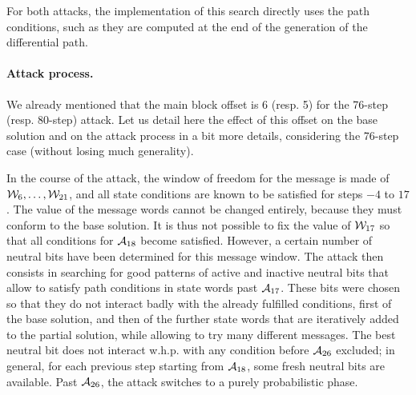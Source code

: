 For both attacks, the implementation of this search directly uses the path conditions, such as they are computed at the end of the generation of the differential path.

\paragraph{Attack process.}
We already mentioned that the main block offset is 6 (resp. 5) for the 76-step (resp. 80-step) attack. Let us detail here the effect of this offset on the base solution and on the attack process
in a bit more details, considering the 76-step case (without losing much generality).

In the course of the attack, the window of freedom for the message is made of $\mathcal{W}_6,\ldots,\mathcal{W}_{21}$, and all state conditions are known to be satisfied for steps $-4$ to $17$.
The value of the message words cannot be changed entirely, because they must conform to the base solution. It is thus not possible to \eg fix the value of $\mathcal{W}_{17}$ so that all conditions
for $\mathcal{A}_{18}$ become satisfied. However, a certain number of neutral bits have been determined for this message window. The attack then consists in searching for good patterns of active and
inactive neutral bits that allow to satisfy path conditions in state words past $\mathcal{A}_{17}$. These bits were chosen so that they do not interact badly with the already fulfilled conditions,
first of the base solution, and then of the further state words that are iteratively added to the partial solution, while allowing to try many different messages. The best neutral bit does not
interact w.h.p. with any condition before $\mathcal{A}_{26}$ excluded; in general, for each previous step starting from $\mathcal{A}_{18}$, some fresh neutral bits are available. Past $\mathcal{A}_{26}$,
the attack switches to a purely probabilistic phase.

